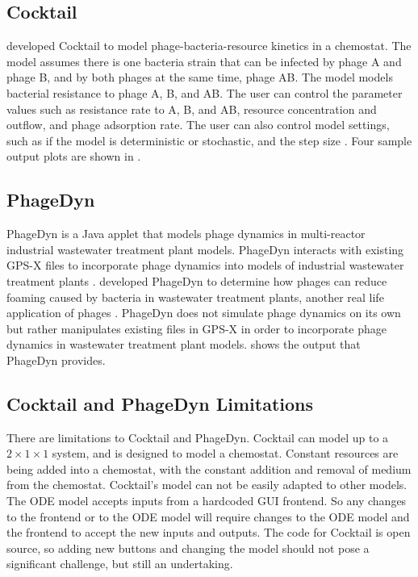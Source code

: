 \subsection{Cocktail}
\citet{nilssonCocktailComputerProgram2022} developed Cocktail to model phage-bacteria-resource kinetics in a chemostat. 
The model assumes there is one bacteria strain that can be infected by phage A and phage B, and by both phages at the same time, phage AB. 
The model models bacterial resistance to phage A, B, and AB. 
The user can control the parameter values such as resistance rate to A, B, and AB, resource concentration and outflow, and phage adsorption rate. 
The user can also control model settings, such as if the model is deterministic or stochastic, and the step size \cite{nilssonCocktailComputerProgram2022}. 
Four sample output plots are shown in . 

\subsection{PhageDyn}
PhageDyn is a Java applet that models phage dynamics in multi-reactor industrial wastewater treatment plant models. 
PhageDyn interacts with existing GPS-X \cite{AdvancedWastewaterModelling} files to incorporate phage dynamics into models of industrial wastewater treatment plants \cite{krysiak-baltynSimulationPhageDynamics2017}. 
\citet{krysiak-baltynSimulationPhageDynamics2017} developed PhageDyn to determine how phages can reduce foaming caused by bacteria in wastewater treatment plants, another real life application of phages \cite{heardEffectFilamentousBacteria2008}. 
PhageDyn does not simulate phage dynamics on its own but rather manipulates existing files in GPS-X in order to incorporate phage dynamics in wastewater treatment plant models. 
 shows the output that PhageDyn provides. 

\subsection{Cocktail and PhageDyn Limitations}
There are limitations to Cocktail and PhageDyn. 
Cocktail can model up to a $2\times 1 \times 1$ system, and is designed to model a chemostat. 
Constant resources are being added into a chemostat, with the constant addition and removal of medium from the chemostat. 
Cocktail's model can not be easily adapted to other models. 
The ODE model accepts inputs from a hardcoded GUI frontend. 
So any changes to the frontend or to the ODE model will require changes to the ODE model and the frontend to accept the new inputs and outputs. 
The code for Cocktail is open source, so adding new buttons and changing the model should not pose a significant challenge, but still an undertaking. 

